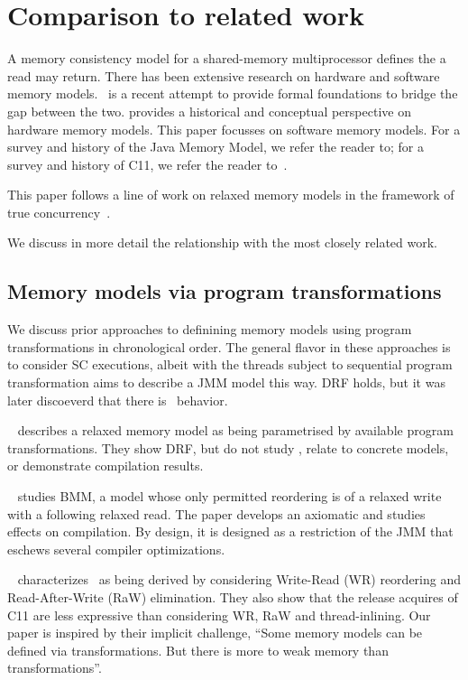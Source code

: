 \section{Comparison to related work}\label{sec:ldrf}
A memory consistency model for a shared-memory multiprocessor defines the a read may return.  There has been extensive research on hardware and software memory models.~\citet{DBLP:journals/pacmpl/PodkopaevLV19} is a recent attempt to provide formal foundations to bridge the gap between the two.  \citet{AlglaveThesis} provides a historical and conceptual perspective on hardware memory models.  This paper focusses on software memory models.   For a survey and history of the Java Memory Model, we refer the reader to\citet{DBLP:journals/toplas/Lochbihler13}; for a survey and history of C11, we refer the reader to~\citet{DBLP:phd/ethos/Batty15}.  

This paper follows a line of work on relaxed memory models in the framework of true concurrency~\cite{DBLP:conf/lics/JeffreyR16,Pichon-Pharabod:2016:CSR:2837614.2837616,DBLP:conf/esop/CenciarelliKS07}.  

We discuss in more detail the relationship with the most closely related work.  

\subsection{Memory models via program transformations}
We discuss prior approaches to definining memory models using program transformations in chronological order.  The general flavor in these approaches is to consider SC executions, albeit with the threads subject to sequential program transformation  \citet{Saraswat:2007:TMM:1229428.1229469} aims to describe a JMM model this way.  DRF holds, but it was later discoeverd that there is \oota\ behavior.

~\cite{DBLP:conf/esop/FerreiraFS10} describes a relaxed memory model as being parametrised by available program transformations.  They show DRF, but do not study \oota, relate to concrete models, or demonstrate compilation results.

~\citet{DBLP:conf/popl/DemangeLZJPV13} studies BMM, a model whose only permitted reordering is of a relaxed write with a following relaxed read.  The paper develops an axiomatic and studies effects on compilation.  By design, it is designed as a restriction of the JMM that eschews several compiler optimizations. 

~\citet{DBLP:conf/fm/LahavV16} characterizes \tso\ as being derived by considering Write-Read (WR) reordering and Read-After-Write (RaW) elimination.  They also show that the release acquires of C11 are less expressive than considering WR, RaW and thread-inlining.  Our paper is inspired by their implicit challenge, ``Some memory models can be defined via transformations.
 But there is more to weak memory than transformations''.  

